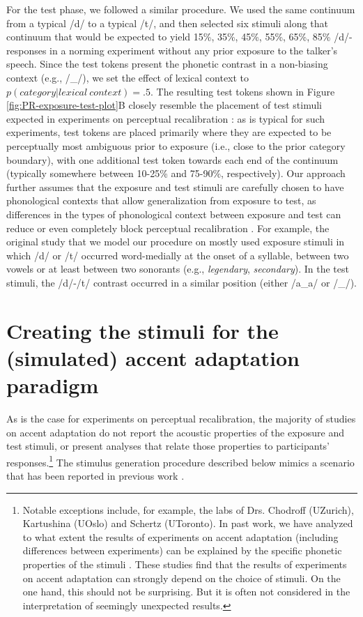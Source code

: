 \documentclass[
  11pt,
  man,floatsintext]{apa6}
\begin{document}
For the test phase, we followed a similar procedure. We used the same continuum from a typical /d/ to a typical /t/, and then selected six stimuli along that continuum that would be expected to yield 15\%, 35\%, 45\%, 55\%, 65\%, 85\% /d/-responses in a norming experiment without any prior exposure to the talker's speech. Since the test tokens present the phonetic contrast in a non-biasing context (e.g., /\_/), we set the effect of lexical context to \(p(category | lexical\ context) = .5\). The resulting test tokens shown in Figure \ref{fig:PR-exposure-test-plot}B closely resemble the placement of test stimuli expected in experiments on perceptual recalibration \autocites[e.g.,][]{norris2003,kraljic-samuel2005,kraljic-samuel2006}: as is typical for such experiments, test tokens are placed primarily where they are expected to be perceptually most ambiguous prior to exposure (i.e., close to the prior category boundary), with one additional test token towards each end of the continuum (typically somewhere between 10-25\% and 75-90\%, respectively). Our approach further assumes that the exposure and test stimuli are carefully chosen to have phonological contexts that allow generalization from exposure to test, as differences in the types of phonological context between exposure and test can reduce or even completely block perceptual recalibration \autocite{eisner2013,mitterer2013}. For example, the original study that we model our procedure on mostly used exposure stimuli in which /d/ or /t/ occurred word-medially at the onset of a syllable, between two vowels \autocite[e.g., \emph{crocodile}, \emph{academic}, etc., see Table 1 in][]{kraljic-samuel2006} or at least between two sonorants (e.g., \emph{legendary}, \emph{secondary}). In the test stimuli, the /d/-/t/ contrast occurred in a similar position (either /a\_a/ or /\_/).

\hypertarget{sec:SI-AA}{%
\section{Creating the stimuli for the (simulated) accent adaptation paradigm}\label{sec:SI-AA}}

As is the case for experiments on perceptual recalibration, the majority of studies on accent adaptation do not report the acoustic properties of the exposure and test stimuli, or present analyses that relate those properties to participants' responses.\footnote{Notable exceptions include, for example, the labs of Drs. Chodroff (UZurich), Kartushina (UOslo) and Schertz (UToronto). In past work, we have analyzed to what extent the results of experiments on accent adaptation (including differences between experiments) can be explained by the specific phonetic properties of the stimuli \autocites[e.g.,][]{tan2021,xie2017,xie2021jep}. These studies find that the results of experiments on accent adaptation can strongly depend on the choice of stimuli. On the one hand, this should not be surprising. But it is often not considered in the interpretation of seemingly unexpected results.} The stimulus generation procedure described below mimics a scenario that has been reported in previous work \autocite[e.g.,][]{schertz2015}.
\end{document}
